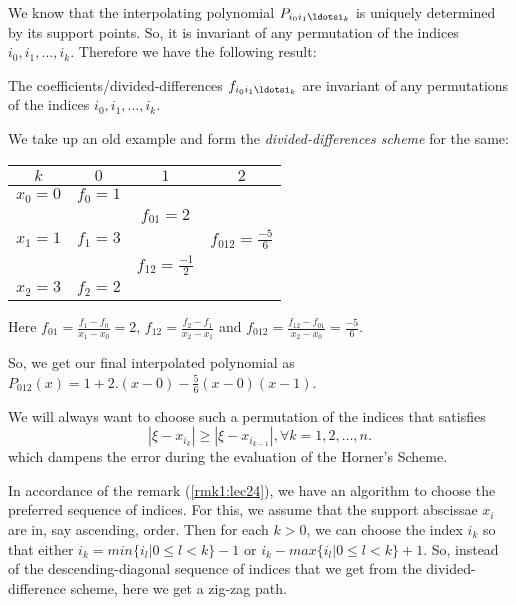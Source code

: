 
We know that the interpolating polynomial $P_{i_0i_1\ldotsi_k}$ is uniquely determined by its support points. So, it is invariant of any permutation of the indices $ i_0,i_1,\ldots,i_k$. Therefore we have the following result:
\begin{thm}
    The coefficients/divided-differences $f_{i_0i_1\ldotsi_k}$ are invariant of any permutations of the indices $ i_0,i_1,\ldots,i_k$.
\end{thm}

\begin{example}\label{ex1:lec24}

We take up an old example and form the \textit{divided-differences scheme} for the same:
    \begin{center}
    \begin{tabular}{c|ccc}
        $k$ &  $0$ &  $1$ &  $2$\\
        \hline
        $x_0=0$ & $f_0=1$ & \\
                & & $f_{01}=2$ & \\
        $ x_1=1$ & $ f_1=3$ & & $f_{012} = \frac{-5}{6}$\\
                 & &  $ f_{12}=\frac{-1}{2}$ &\\
        $ x_2=3$ & $ f_2=2$ & \\
    \end{tabular}
    \end{center}

Here $f_{01} = \frac{f_1-f_0}{x_1-x_0} = 2$, $f_{12} = \frac{f_2-f_1}{x_2-x_1}$ and $f_{012} = \frac{f_{12}-f_{01}}{x_2-x_0} = \frac{-5}{6}$.
 
So, we get our final interpolated polynomial as $P_{012}(x) = 1+2.(x-0)-\frac{5}{6}(x-0)(x-1)$.
\end{example}

\begin{rmk}\label{rmk1:lec24}
    We will always want to choose such a permutation of the indices that satisfies
    \[
        |\xi - x_{i_k}| \ge  |\xi - x_{i_{k-1}}|, \forall k=1,2,\ldots,n
    .\] 
which dampens the error during the evaluation of the Horner's Scheme.
\end{rmk}

In accordance of the remark (\ref{rmk1:lec24}), we have an algorithm to choose the preferred sequence of indices. For this, we assume that the support abscissae $x_i$ are in, say ascending, order. Then for each  $k>0$, we can choose the index  $i_k$ so that either  $i_k = min\{i_l|0\le l<k\}-1$ or $i_k - max\{i_l|0\le l<k\}+1$. So, instead of the descending-diagonal sequence of indices that we get from the divided-difference scheme, here we get a zig-zag path.

